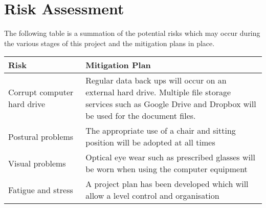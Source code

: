 \chapter{Risk Assessment}
The following table is a summation of the potential risks which may occur during the various stages of this project and the mitigation plans in place.

\begin{center}
    \begin{tabular}{ | p{0.3\linewidth} | p{0.7\linewidth} |}
    \hline
    \textbf{Risk} & \textbf{Mitigation Plan} \\ \hline
    Corrupt computer hard drive & Regular data back ups will occur on an external hard drive. Multiple file storage services such as Google Drive and Dropbox will be used for the document files. \\ \hline
   Postural problems  & The appropriate use of a chair and sitting position will be adopted at all times \\ \hline
Visual problems & Optical eye wear such as prescribed glasses will be worn when using the computer equipment  \\ \hline
Fatigue and stress & A project plan has been developed which will allow a level control and organisation \\ \hline
    \end{tabular}
\end{center}